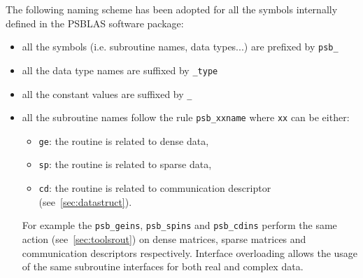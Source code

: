 The following naming scheme has been adopted for all the symbols
internally defined in the PSBLAS software package:
\begin{itemize}
\item all the symbols (i.e. subroutine names, data types...) are
  prefixed by \verb|psb_| 
\item all the data type names are suffixed by \verb|_type|
\item all the constant values are suffixed by \verb|_|
\item all the subroutine names follow the rule \verb|psb_xxname| where
  \verb|xx| can be either:
  \begin{itemize}
  \item \verb|ge|: the routine is related to dense data, 
  \item \verb|sp|: the routine is related to sparse data, 
  \item \verb|cd|: the routine is related to communication descriptor (see~\ref{sec:datastruct}).
  \end{itemize}
  For example the \verb|psb_geins|, \verb|psb_spins| and
  \verb|psb_cdins| perform the same action (see~\ref{sec:toolsrout}) on
  dense matrices, sparse matrices and communication descriptors
  respectively.
  Interface overloading allows the usage of the same subroutine
  interfaces for both real and complex data.
\end{itemize}

